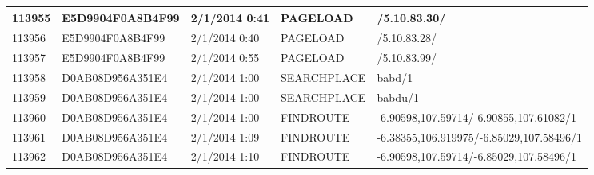 \begin{longtable}{|p{1cm}|l|l|l|p{8cm}|}
113955         & E5D9904F0A8B4F99 & 2/1/2014 0:41            & PAGELOAD        & /5.10.83.30/                                                                                                                                                                                                          \\ \hline
113956         & E5D9904F0A8B4F99 & 2/1/2014 0:40            & PAGELOAD        & /5.10.83.28/                                                                                                                                                                                                          \\ \hline
113957         & E5D9904F0A8B4F99 & 2/1/2014 0:55            & PAGELOAD        & /5.10.83.99/                                                                                                                                                                                                          \\ \hline
113958         & D0AB08D956A351E4 & 2/1/2014 1:00            & SEARCHPLACE     & babd/1                                                                                                                                                                                                                \\ \hline
113959         & D0AB08D956A351E4 & 2/1/2014 1:00            & SEARCHPLACE     & babdu/1                                                                                                                                                                                                               \\ \hline
113960         & D0AB08D956A351E4 & 2/1/2014 1:00            & FINDROUTE       & -6.90598,107.59714/-6.90855,107.61082/1                                                                                                                                                                               \\ \hline
113961         & D0AB08D956A351E4 & 2/1/2014 1:09            & FINDROUTE       & -6.38355,106.919975/-6.85029,107.58496/1                                                                                                                                                                              \\ \hline
113962         & D0AB08D956A351E4 & 2/1/2014 1:10            & FINDROUTE       & -6.90598,107.59714/-6.85029,107.58496/1                                                                                                                                                                               \\ \hline

\end{longtable}
